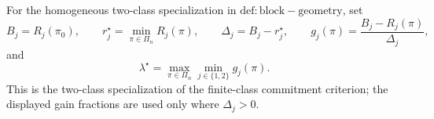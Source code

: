 For the homogeneous two-class specialization in \(\mathrm{def:block-geometry}\), set
\[
B_j=R_j(\pi_0),
\qquad
r_j^\star=\min_{\pi\in\Pi_n}R_j(\pi),
\qquad
\Delta_j=B_j-r_j^\star,
\qquad
g_j(\pi)=\frac{B_j-R_j(\pi)}{\Delta_j},
\]
and
\[
\lambda^\star=\max_{\pi\in\Pi_n}\min_{j\in\{1,2\}}g_j(\pi).
\]
This is the two-class specialization of the finite-class commitment criterion; the displayed gain fractions are used only where \(\Delta_j>0\).